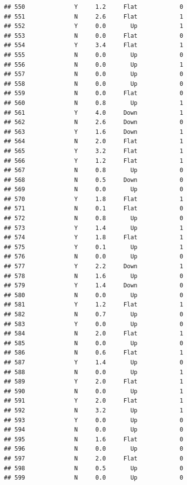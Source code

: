 \documentclass[
]{article}
\begin{document}
\begin{verbatim}
## 550              Y     1.2     Flat            0
## 551              N     2.6     Flat            1
## 552              Y     0.0       Up            1
## 553              N     0.0     Flat            0
## 554              Y     3.4     Flat            1
## 555              N     0.0       Up            0
## 556              N     0.0       Up            1
## 557              N     0.0       Up            0
## 558              N     0.0       Up            0
## 559              N     0.0     Flat            0
## 560              N     0.8       Up            1
## 561              Y     4.0     Down            1
## 562              N     2.6     Down            0
## 563              Y     1.6     Down            1
## 564              N     2.0     Flat            1
## 565              Y     3.2     Flat            1
## 566              Y     1.2     Flat            1
## 567              N     0.8       Up            0
## 568              N     0.5     Down            0
## 569              N     0.0       Up            0
## 570              Y     1.8     Flat            1
## 571              N     0.1     Flat            0
## 572              N     0.8       Up            0
## 573              Y     1.4       Up            1
## 574              Y     1.8     Flat            1
## 575              Y     0.1       Up            1
## 576              N     0.0       Up            0
## 577              Y     2.2     Down            1
## 578              N     1.6       Up            0
## 579              Y     1.4     Down            0
## 580              N     0.0       Up            0
## 581              Y     1.2     Flat            1
## 582              N     0.7       Up            0
## 583              Y     0.0       Up            0
## 584              N     2.0     Flat            1
## 585              N     0.0       Up            0
## 586              N     0.6     Flat            1
## 587              Y     1.4       Up            0
## 588              N     0.0       Up            1
## 589              Y     2.0     Flat            1
## 590              N     0.0       Up            1
## 591              Y     2.0     Flat            1
## 592              N     3.2       Up            1
## 593              Y     0.0       Up            0
## 594              N     0.0       Up            0
## 595              N     1.6     Flat            0
## 596              N     0.0       Up            0
## 597              N     2.0     Flat            0
## 598              N     0.5       Up            0
## 599              N     0.0       Up            0

\end{verbatim}
\end{document}
